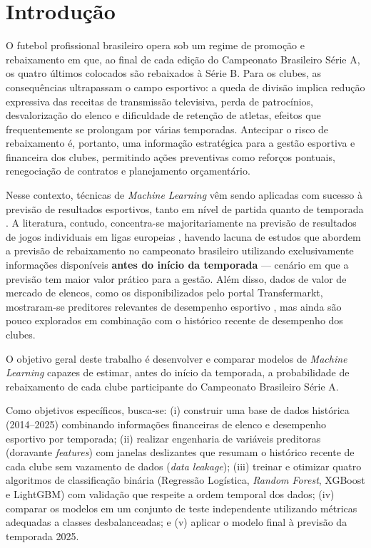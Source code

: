 \documentclass[
    article,
    12pt,
    oneside,
    a4paper,
    english,
    brazilian
    ]{abntex2}
\begin{document}
\textual

\section{Introdução}

O futebol profissional brasileiro opera sob um regime de promoção e rebaixamento em que, ao final de cada edição do Campeonato Brasileiro Série A, os quatro últimos colocados são rebaixados à Série B. Para os clubes, as consequências ultrapassam o campo esportivo: a queda de divisão implica redução expressiva das receitas de transmissão televisiva, perda de patrocínios, desvalorização do elenco e dificuldade de retenção de atletas, efeitos que frequentemente se prolongam por várias temporadas. Antecipar o risco de rebaixamento é, portanto, uma informação estratégica para a gestão esportiva e financeira dos clubes, permitindo ações preventivas como reforços pontuais, renegociação de contratos e planejamento orçamentário.

Nesse contexto, técnicas de \textit{Machine Learning} vêm sendo aplicadas com sucesso à previsão de resultados esportivos, tanto em nível de partida quanto de temporada \cite{bunker2019, baboota2019}. A literatura, contudo, concentra-se majoritariamente na previsão de resultados de jogos individuais em ligas europeias \cite{constantinou2012}, havendo lacuna de estudos que abordem a previsão de rebaixamento no campeonato brasileiro utilizando exclusivamente informações disponíveis \textbf{antes do início da temporada} --- cenário em que a previsão tem maior valor prático para a gestão. Além disso, dados de valor de mercado de elencos, como os disponibilizados pelo portal Transfermarkt, mostraram-se preditores relevantes de desempenho esportivo \cite{muller2017}, mas ainda são pouco explorados em combinação com o histórico recente de desempenho dos clubes.

O objetivo geral deste trabalho é desenvolver e comparar modelos de \textit{Machine Learning} capazes de estimar, antes do início da temporada, a probabilidade de rebaixamento de cada clube participante do Campeonato Brasileiro Série A.

Como objetivos específicos, busca-se: (i) construir uma base de dados histórica (2014--2025) combinando informações financeiras de elenco e desempenho esportivo por temporada; (ii) realizar engenharia de variáveis preditoras (doravante \textit{features}) com janelas deslizantes que resumam o histórico recente de cada clube sem vazamento de dados (\textit{data leakage}); (iii) treinar e otimizar quatro algoritmos de classificação binária (Regressão Logística, \textit{Random Forest}, XGBoost e LightGBM) com validação que respeite a ordem temporal dos dados; (iv) comparar os modelos em um conjunto de teste independente utilizando métricas adequadas a classes desbalanceadas; e (v) aplicar o modelo final à previsão da temporada 2025.
\end{document}
